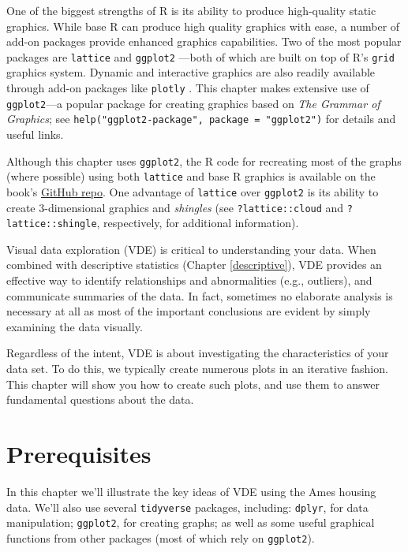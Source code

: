 \documentclass[]{book}
\theoremstyle{definition}
\theoremstyle{definition}
\theoremstyle{definition}
\theoremstyle{remark}
\let\BeginKnitrBlock\begin \let\EndKnitrBlock\end
\begin{document}
One of the biggest strengths of R is its ability to produce high-quality
static graphics. While base R can produce high quality graphics with
ease, a number of add-on packages provide enhanced graphics
capabilities. Two of the most popular packages are \texttt{lattice}
\citep{pkg-lattice} and \texttt{ggplot2} \citep{pkg-ggplot2}---both of
which are built on top of R's \texttt{grid} graphics system. Dynamic and
interactive graphics are also readily available through add-on packages
like \texttt{plotly} \citep{pkg-plotly}. This chapter makes extensive
use of \texttt{ggplot2}---a popular package for creating graphics based
on \emph{The Grammar of Graphics}; see
\texttt{help("ggplot2-package",\ package\ =\ "ggplot2")} for details and
useful links.

\BeginKnitrBlock{note}
Although this chapter uses \texttt{ggplot2}, the R code for recreating
most of the graphs (where possible) using both \texttt{lattice} and base
R graphics is available on the book's
\href{https://github.com/koalaverse/abar}{GitHub repo}. One advantage of
\texttt{lattice} over \texttt{ggplot2} is its ability to create
3-dimensional graphics and \emph{shingles} (see \texttt{?lattice::cloud}
and \texttt{?lattice::shingle}, respectively, for additional
information).
\EndKnitrBlock{note}

Visual data exploration (VDE) is critical to understanding your data.
When combined with descriptive statistics (Chapter \ref{descriptive}),
VDE provides an effective way to identify relationships and
abnormalities (e.g., outliers), and communicate summaries of the data.
In fact, sometimes no elaborate analysis is necessary at all as most of
the important conclusions are evident by simply examining the data
visually.

Regardless of the intent, VDE is about investigating the characteristics
of your data set. To do this, we typically create numerous plots in an
iterative fashion. This chapter will show you how to create such plots,
and use them to answer fundamental questions about the data.

\hypertarget{prerequisites-1}{%
\section{Prerequisites}\label{prerequisites-1}}

In this chapter we'll illustrate the key ideas of VDE using the Ames
housing data. We'll also use several \texttt{tidyverse} packages,
including: \texttt{dplyr}, for data manipulation; \texttt{ggplot2}, for
creating graphs; as well as some useful graphical functions from other
packages (most of which rely on \texttt{ggplot2}).
\end{document}
